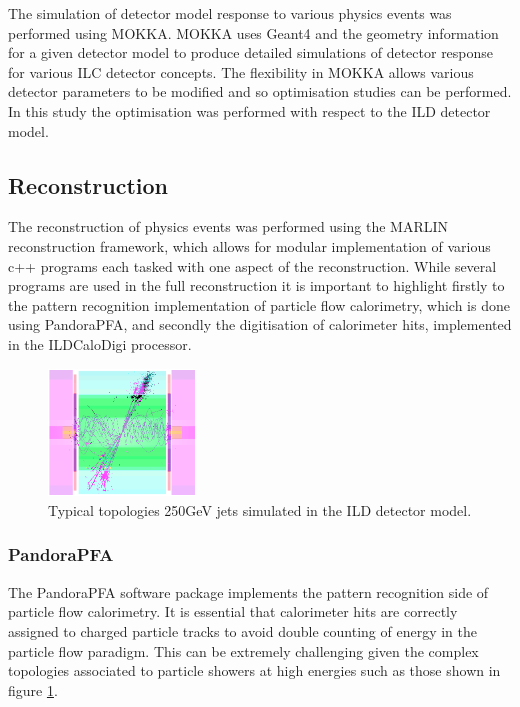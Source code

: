 \documentclass[final,3p,times,twocolumn]{elsarticle}
\begin{document}
The simulation of detector model response to various physics events was performed using MOKKA.  MOKKA uses Geant4 and the geometry information for a given detector model to produce detailed simulations of detector response for various ILC detector concepts.  The flexibility in MOKKA allows various detector parameters to be modified and so optimisation studies can be performed.  In this study the optimisation was performed with respect to the ILD detector model.  

\subsection{Reconstruction}

The reconstruction of physics events was performed using the MARLIN reconstruction framework, which allows for modular implementation of various c++ programs each tasked with one aspect of the reconstruction.  While several programs are used in the full reconstruction it is important to highlight firstly to the pattern recognition implementation of particle flow calorimetry, which is done using PandoraPFA, and secondly the digitisation of calorimeter hits, implemented in the ILDCaloDigi processor.  

\begin{figure}[!h]
  \begin{center}
     \includegraphics[width=0.35\textwidth]{3_Implementation/500GeVJets.png}
     \caption{Typical topologies 250GeV jets simulated in the ILD detector model.  \label{2-jets}}
  \end{center}
\end{figure}

\subsubsection{PandoraPFA}

The PandoraPFA software package implements the pattern recognition side of particle flow calorimetry.  It is essential that calorimeter hits are correctly assigned to charged particle tracks to avoid double counting of energy in the particle flow paradigm.  This can be extremely challenging given the complex topologies associated to particle showers at high energies such as those shown in figure \ref{2-jets}.
\end{document}
